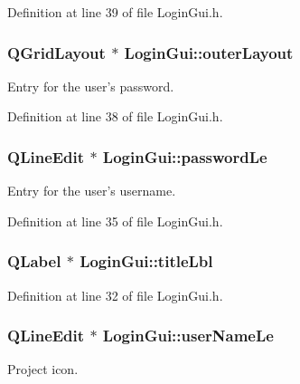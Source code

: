 Definition at line 39 of file Login\-Gui.\-h.

\hypertarget{class_login_gui_abcebf364fa135ec3b00162e6fe6ef2d1}{
\subsubsection[{outer\-Layout}]{\setlength{\rightskip}{0pt plus 5cm}Q\-Grid\-Layout $\ast$ Login\-Gui\-::outer\-Layout\hspace{0.3cm}{\ttfamily [private]}}}\label{class_login_gui_abcebf364fa135ec3b00162e6fe6ef2d1}
Entry for the user's password. 

Definition at line 38 of file Login\-Gui.\-h.

\hypertarget{class_login_gui_a4efd7ef41a67cfdc6d88130d34c5b77f}{
\subsubsection[{password\-Le}]{\setlength{\rightskip}{0pt plus 5cm}Q\-Line\-Edit $\ast$ Login\-Gui\-::password\-Le\hspace{0.3cm}{\ttfamily [private]}}}\label{class_login_gui_a4efd7ef41a67cfdc6d88130d34c5b77f}
Entry for the user's username. 

Definition at line 35 of file Login\-Gui.\-h.

\hypertarget{class_login_gui_a565b6f7b6cd1dff7729219f237a4dfd3}{
\subsubsection[{title\-Lbl}]{\setlength{\rightskip}{0pt plus 5cm}Q\-Label $\ast$ Login\-Gui\-::title\-Lbl\hspace{0.3cm}{\ttfamily [private]}}}\label{class_login_gui_a565b6f7b6cd1dff7729219f237a4dfd3}


Definition at line 32 of file Login\-Gui.\-h.

\hypertarget{class_login_gui_aeb8a7174d367f20dedcc6eb011ce0d6e}{
\subsubsection[{user\-Name\-Le}]{\setlength{\rightskip}{0pt plus 5cm}Q\-Line\-Edit $\ast$ Login\-Gui\-::user\-Name\-Le\hspace{0.3cm}{\ttfamily [private]}}}\label{class_login_gui_aeb8a7174d367f20dedcc6eb011ce0d6e}
Project icon. 

